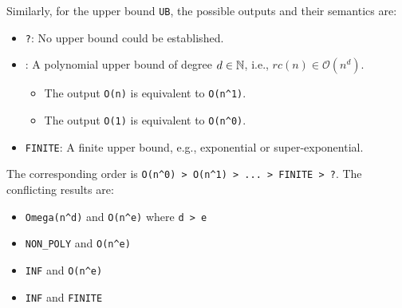 Similarly, for the upper bound \texttt{UB}, the possible outputs and their semantics are:
\begin{itemize}
    \item \texttt{?}: No upper bound could be established.
    \item {}: A polynomial upper bound of degree $d \in \mathbb{N}$, i.e., $rc(n) \in \mathcal{O}(n^d)$.
      \begin{itemize}
      \item The output \texttt{O(n)} is equivalent to \texttt{O(n\textasciicircum 1)}.
      \item The output \texttt{O(1)} is equivalent to \texttt{O(n\textasciicircum 0)}.
      \end{itemize}
    \item \texttt{FINITE}: A finite upper bound, e.g., exponential or super-exponential.
\end{itemize}
%
The corresponding order is \texttt{O(n\textasciicircum 0) > O(n\textasciicircum 1) > ... > FINITE > ?}.
%
The conflicting results are:
\begin{itemize}
\item \texttt{Omega(n\textasciicircum d)} and \texttt{O(n\textasciicircum e)} where \texttt{d > e}
\item \texttt{NON\_POLY} and \texttt{O(n\textasciicircum e)}
\item \texttt{INF} and \texttt{O(n\textasciicircum e)}
\item \texttt{INF} and \texttt{FINITE}
\end{itemize}
